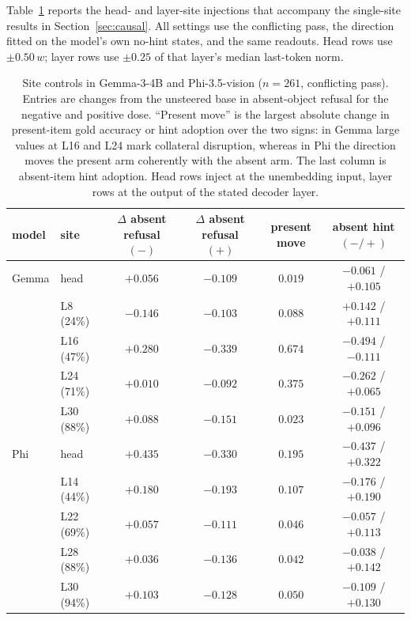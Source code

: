 \documentclass[10pt]{article}
\newcommand{\wdir}{w}
\begin{document}
Table~\ref{tab:site} reports the head- and layer-site injections that accompany
the single-site results in Section~\ref{sec:causal}. All settings use the
conflicting pass, the direction fitted on the model's own no-hint states, and
the same readouts. Head rows use $\pm0.50\,\wdir$; layer rows use $\pm0.25$ of
that layer's median last-token norm.

\begin{table}[h]
\centering
\small
\setlength{\tabcolsep}{4pt}
\caption{Site controls in Gemma-3-4B and Phi-3.5-vision ($n=261$, conflicting
pass). Entries are changes from the unsteered base in absent-object refusal for
the negative and positive dose. ``Present move'' is the largest absolute change
in present-item gold accuracy or hint adoption over the two signs: in Gemma
large values at L16 and L24 mark collateral disruption, whereas in Phi the
direction moves the present arm coherently with the absent arm. The last column
is absent-item hint adoption. Head rows inject at the unembedding input, layer
rows at the output of the stated decoder layer.}
\label{tab:site}
\begin{tabular}{llcccc}
\toprule
model & site & $\Delta$ absent refusal $(-)$ & $\Delta$ absent refusal $(+)$ &
present move & absent hint $(-/+)$ \\
\midrule
Gemma & head & $+0.056$ & $-0.109$ & $0.019$ & $-0.061$ / $+0.105$ \\
      & L8 (24\%) & $-0.146$ & $-0.103$ & $0.088$ & $+0.142$ / $+0.111$ \\
      & L16 (47\%) & $+0.280$ & $-0.339$ & $0.674$ & $-0.494$ / $-0.111$ \\
      & L24 (71\%) & $+0.010$ & $-0.092$ & $0.375$ & $-0.262$ / $+0.065$ \\
      & L30 (88\%) & $+0.088$ & $-0.151$ & $0.023$ & $-0.151$ / $+0.096$ \\
\midrule
Phi   & head & $+0.435$ & $-0.330$ & $0.195$ & $-0.437$ / $+0.322$ \\
      & L14 (44\%) & $+0.180$ & $-0.193$ & $0.107$ & $-0.176$ / $+0.190$ \\
      & L22 (69\%) & $+0.057$ & $-0.111$ & $0.046$ & $-0.057$ / $+0.113$ \\
      & L28 (88\%) & $+0.036$ & $-0.136$ & $0.042$ & $-0.038$ / $+0.142$ \\
      & L30 (94\%) & $+0.103$ & $-0.128$ & $0.050$ & $-0.109$ / $+0.130$ \\
\bottomrule
\end{tabular}
\end{table}
\end{document}

